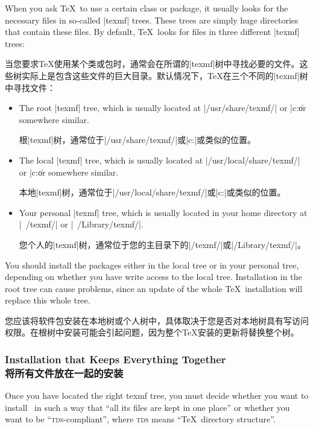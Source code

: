 When you ask \TeX\ to use a certain class or package, it usually looks for the
necessary files in so-called |texmf| trees. These trees are simply huge
directories that contain these files. By default, \TeX\ looks for files in
three different |texmf| trees:

当您要求\TeX 使用某个类或包时，通常会在所谓的|texmf|树中寻找必要的文件。这些树实际上是包含这些文件的巨大目录。默认情况下，\TeX 在三个不同的|texmf|树中寻找文件：
%
\begin{itemize}
    \item The root |texmf| tree, which is usually located at
        |/usr/share/texmf/| or |c:\texmf\| or somewhere similar.

        根|texmf|树，通常位于|/usr/share/texmf/|或|c:\texmf|或类似的位置。
    \item The local  |texmf| tree, which is usually located at
        |/usr/local/share/texmf/| or |c:\localtexmf\| or somewhere similar.

        本地|texmf|树，通常位于|/usr/local/share/texmf/|或|c:\localtexmf|或类似的位置。
    \item Your personal  |texmf| tree, which is usually located in your home
        directory at |~/texmf/| or |~/Library/texmf/|.

        您个人的|texmf|树，通常位于您的主目录下的|/texmf/|或|/Library/texmf/|。
\end{itemize}

You should install the packages either in the local tree or in your personal
tree, depending on whether you have write access to the local tree.
Installation in the root tree can cause problems, since an update of the whole
\TeX\ installation will replace this whole tree.

您应该将软件包安装在本地树或个人树中，具体取决于您是否对本地树具有写访问权限。在根树中安装可能会引起问题，因为整个\TeX 安装的更新将替换整个树。


\subsubsection{Installation that Keeps Everything Together\\将所有文件放在一起的安装}

Once you have located the right texmf tree, you must decide whether you want to
install \pgfname\ in such a way that ``all its files are kept in one place'' or
whether you want to be ``\textsc{tds}-compliant'', where \textsc{tds} means
``\TeX\ directory structure''.

